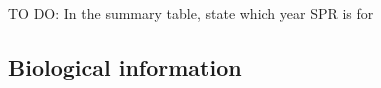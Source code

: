 \documentclass[11pt,
  english,
  a4paper,
]{article}
\begin{document}
\leavevmode\tagmcend\tagstructend\par


TO DO: In the summary table, state which year SPR is for

\leavevmode\tagmcend\tagstructend\par


\hypertarget{biological-information}{%
\subsection{Biological information}\label{biological-information}}

\leavevmode\tagmcend\tagstructend

\begingroup\fontsize{10}{12}\selectfont
\begingroup\fontsize{10}{12}\selectfont
\end{document}

